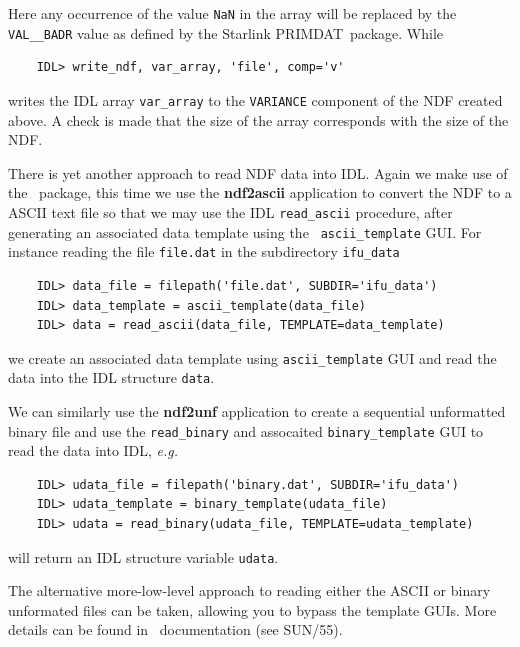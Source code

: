 \documentclass[twoside,11pt]{article}
\newcommand{\xref}[3]{#1}
\begin{document}
\begin{\htmlonly}
Here any occurrence of the value {\tt NaN} in the array will be
replaced by the {\tt VAL\_\_BADR} value as defined by the Starlink
{\footnotesize PRIMDAT}\normalsize\ package.  While

\small\begin{verbatim}
    IDL> write_ndf, var_array, 'file', comp='v'
\end{verbatim}\normalsize    
 
writes the IDL array {\tt var\_array} to the {\tt VARIANCE} component
of the NDF created above.  A check is made that the size of the array
corresponds with the size of the NDF. 

There is yet another approach to read NDF data into IDL.  Again we
make use of the \CONVERT\ package, this time we use the \xref{{\bf
ndf2ascii}}{sun55}{NDF2ASCII} application to convert the NDF to a
ASCII text file so that we may use the IDL {\tt read\_ascii}
procedure, after generating an associated data template using the {\tt
ascii\_template} GUI.  For instance reading the file {\tt file.dat} in
the subdirectory {\tt ifu\_data}

\small\begin{verbatim}
    IDL> data_file = filepath('file.dat', SUBDIR='ifu_data')
    IDL> data_template = ascii_template(data_file)
    IDL> data = read_ascii(data_file, TEMPLATE=data_template)
\end{verbatim}\normalsize 

we create an associated data template using {\tt ascii\_template} GUI
and read the data into the IDL structure {\tt data}.

We can similarly use the \xref{{\bf ndf2unf}}{sun55}{NDF2UNF}
application to create a sequential unformatted binary file and use the
{\tt read\_binary} and assocaited {\tt binary\_template} GUI to read
the data into IDL, \emph{e.g.}

\small\begin{verbatim}
    IDL> udata_file = filepath('binary.dat', SUBDIR='ifu_data')
    IDL> udata_template = binary_template(udata_file)
    IDL> udata = read_binary(udata_file, TEMPLATE=udata_template)
\end{verbatim}\normalsize 

will return an IDL structure variable {\tt udata}.

The alternative more-low-level approach to reading either the ASCII or
binary unformated files can be taken, allowing you to bypass the
template GUIs.  More details can be found in \CONVERT\ documentation (see
\xref{SUN/55}{sun55}{}).


\end{\htmlonly}
\end{document}
